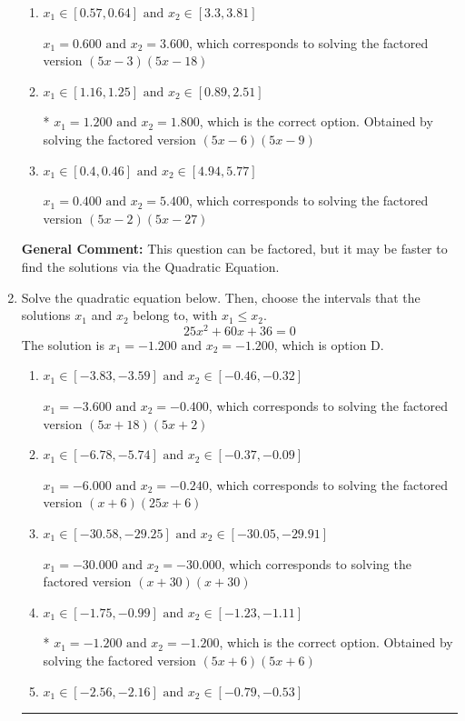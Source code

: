 \documentclass{extbook}[14pt]
\newcommand{\litem}[1]{\item #1

\rule{\textwidth}{0.4pt}}
\begin{document}
\begin{enumerate}
{\begin{enumerate}[label=\Alph*.]
$x_1 = 30.000 \text{ and } x_2 = 45.000$, which corresponds to solving the factored version $(x -30)(x -45)$
\item \( x_1 \in [0.57, 0.64] \text{ and } x_2 \in [3.3, 3.81] \)

$x_1 = 0.600 \text{ and } x_2 = 3.600$, which corresponds to solving the factored version $(5x -3)(5x -18)$
\item \( x_1 \in [1.16, 1.25] \text{ and } x_2 \in [0.89, 2.51] \)

* $x_1 = 1.200 \text{ and } x_2 = 1.800$, which is the correct option. Obtained by solving the factored version $(5x -6)(5x -9)$
\item \( x_1 \in [0.4, 0.46] \text{ and } x_2 \in [4.94, 5.77] \)

$x_1 = 0.400 \text{ and } x_2 = 5.400$, which corresponds to solving the factored version $(5x -2)(5x -27)$
\end{enumerate}

\textbf{General Comment:} This question can be factored, but it may be faster to find the solutions via the Quadratic Equation.
}
\litem{
Solve the quadratic equation below. Then, choose the intervals that the solutions $x_1$ and $x_2$ belong to, with $x_1 \leq x_2$.
\[ 25x^{2} +60 x + 36 = 0 \]The solution is \( x_1 = -1.200 \text{ and } x_2 = -1.200 \), which is option D.\begin{enumerate}[label=\Alph*.]
\item \( x_1 \in [-3.83, -3.59] \text{ and } x_2 \in [-0.46, -0.32] \)

$x_1 = -3.600 \text{ and } x_2 = -0.400$, which corresponds to solving the factored version $(5x + 18)(5x + 2)$
\item \( x_1 \in [-6.78, -5.74] \text{ and } x_2 \in [-0.37, -0.09] \)

$x_1 = -6.000 \text{ and } x_2 = -0.240$, which corresponds to solving the factored version $(x + 6)(25x + 6)$
\item \( x_1 \in [-30.58, -29.25] \text{ and } x_2 \in [-30.05, -29.91] \)

$x_1 = -30.000 \text{ and } x_2 = -30.000$, which corresponds to solving the factored version $(x + 30)(x + 30)$
\item \( x_1 \in [-1.75, -0.99] \text{ and } x_2 \in [-1.23, -1.11] \)

* $x_1 = -1.200 \text{ and } x_2 = -1.200$, which is the correct option. Obtained by solving the factored version $(5x + 6)(5x + 6)$
\item \( x_1 \in [-2.56, -2.16] \text{ and } x_2 \in [-0.79, -0.53] \)


\end{enumerate}}
\end{enumerate}
\end{document}
